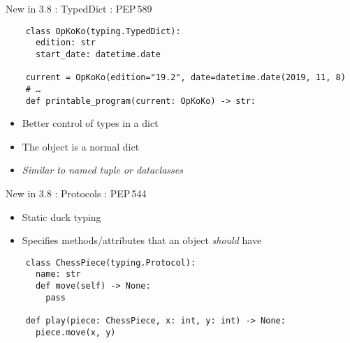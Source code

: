 \begin{frame}[fragile]{New in 3.8 : TypedDict : PEP\,589}

  \begin{verbatim}
    class OpKoKo(typing.TypedDict):
      edition: str
      start_date: datetime.date

    current = OpKoKo(edition="19.2", date=datetime.date(2019, 11, 8)
    # …
    def printable_program(current: OpKoKo) -> str:
  \end{verbatim}

  \begin{itemize}
    \item Better control of types in a dict
    \item The object is a normal dict
    \item \emph{Similar to \emph{named tuple} or \emph{dataclasses}}
  \end{itemize}
\end{frame}

\begin{frame}[fragile]{New in 3.8 : Protocols : PEP\,544}
  \begin{itemize}
    \item Static duck typing
    \item Specifies methods/attributes that an object \emph{should} have
  \end{itemize}

  \begin{verbatim}
    class ChessPiece(typing.Protocol):
      name: str
      def move(self) -> None:
        pass

    def play(piece: ChessPiece, x: int, y: int) -> None:
      piece.move(x, y)
  \end{verbatim}
\end{frame}

